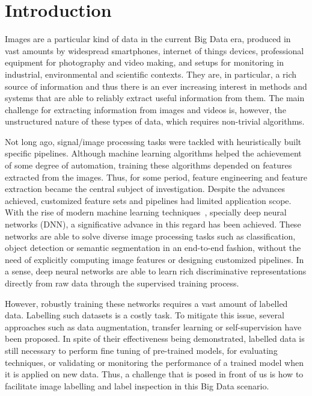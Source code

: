 \documentclass[sn-basic]{sn-jnl}%
\theoremstyle{thmstyleone}%
\theoremstyle{thmstyletwo}%
\theoremstyle{thmstylethree}%
\begin{document}
\section{Introduction}\label{sec1}

Images are a particular kind of data in the current Big Data era, produced in vast amounts by widespread smartphones, internet of things devices, professional equipment for photography and video making, and setups for monitoring in industrial, environmental and scientific contexts. They are, in particular, a rich source of information and thus there is an ever increasing interest in methods and systems that are able to reliably extract useful information from them. The main challenge for extracting information from images and videos is, however, the unstructured nature of these types of data, which requires non-trivial algorithms.

Not long ago, signal/image processing tasks were tackled with heuristically built specific pipelines. Although machine learning algorithms helped the achievement of some degree of automation, training these algorithms depended on features extracted from the images. Thus, for some period, feature engineering and feature extraction became the central subject of investigation. Despite the advances achieved, customized feature sets and pipelines had limited application scope. With the rise of modern machine learning techniques~\citep{goodfellow-book}, specially deep neural networks (DNN), a significative advance in this regard has been achieved. These networks are able to solve diverse image processing tasks such as classification, object detection or semantic segmentation in an end-to-end fashion, without the need of explicitly computing image features or designing customized pipelines. In a sense, deep neural networks are able to learn rich discriminative representations directly from raw data through the supervised training process.

However, robustly training these networks requires a vast amount of labelled data. Labelling such datasets is a costly task. To mitigate this issue, several approaches such as data augmentation, transfer learning or self-supervision have been proposed. In spite of their effectiveness being demonstrated, labelled data is still necessary to perform fine tuning of pre-trained models, for evaluating techniques, or validating or monitoring the performance of a trained model when it is applied on new data. Thus, a challenge that is posed in front of us is how to facilitate image labelling and label inspection in this Big Data scenario.
\end{document}
